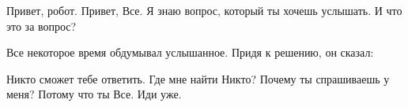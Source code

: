 \begin{dialog}
\X Привет, робот.
\R Привет, Все.
\X Я знаю вопрос, который ты хочешь услышать.
\R И что это за вопрос?
\end{dialog}

\begin{monolog}
Все некоторое время обдумывал услышанное. Придя к решению, он сказал:
\end{monolog}

\begin{dialog}
\X Никто сможет тебе ответить.
\R Где мне найти Никто?
\X Почему ты спрашиваешь у меня?
\R Потому что ты Все.
\X Иди уже.
\end{dialog}